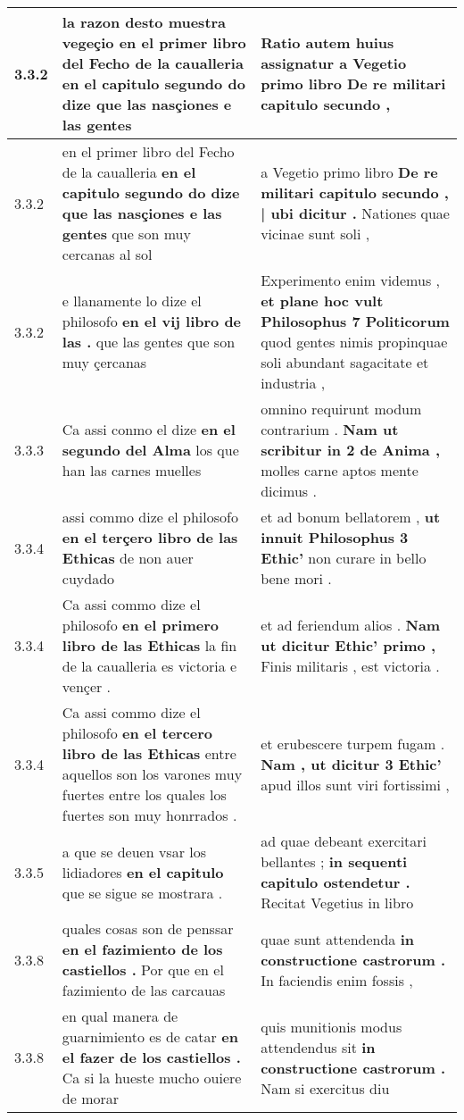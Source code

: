 \begin{tabular}{|p{1cm}|p{6.5cm}|p{6.5cm}|}
3.3.2 & la razon desto muestra vegeçio \textbf{ en el primer libro del Fecho de la caualleria } en el capitulo segundo do dize que las nasçiones e las gentes & Ratio autem huius assignatur \textbf{ a Vegetio primo libro } De re militari capitulo secundo , \\\hline
3.3.2 & en el primer libro del Fecho de la caualleria \textbf{ en el capitulo segundo do dize que las nasçiones e las gentes } que son muy cercanas al sol & a Vegetio primo libro \textbf{ De re militari capitulo secundo , | ubi dicitur . } Nationes quae vicinae sunt soli , \\\hline
3.3.2 & e llanamente lo dize el philosofo \textbf{ en el vij libro de las . } que las gentes que son muy çercanas & Experimento enim videmus , \textbf{ et plane hoc vult Philosophus 7 Politicorum } quod gentes nimis propinquae soli abundant sagacitate et industria , \\\hline
3.3.3 & Ca assi conmo el dize \textbf{ en el segundo del Alma } los que han las carnes muelles & omnino requirunt modum contrarium . \textbf{ Nam ut scribitur in 2 de Anima , } molles carne aptos mente dicimus . \\\hline
3.3.4 & assi commo dize el philosofo \textbf{ en el terçero libro de las Ethicas } de non auer cuydado & et ad bonum bellatorem , \textbf{ ut innuit Philosophus 3 Ethic’ } non curare in bello bene mori . \\\hline
3.3.4 & Ca assi commo dize el philosofo \textbf{ en el primero libro de las Ethicas } la fin de la caualleria es victoria e vençer . & et ad feriendum alios . \textbf{ Nam ut dicitur Ethic’ primo , } Finis militaris , est victoria . \\\hline
3.3.4 & Ca assi commo dize el philosofo \textbf{ en el tercero libro de las Ethicas } entre aquellos son los varones muy fuertes entre los quales los fuertes son muy honrrados . & et erubescere turpem fugam . \textbf{ Nam , ut dicitur 3 Ethic’ } apud illos sunt viri fortissimi , \\\hline
3.3.5 & a que se deuen vsar los lidiadores \textbf{ en el capitulo } que se sigue se mostrara . & ad quae debeant exercitari bellantes ; \textbf{ in sequenti capitulo ostendetur . } Recitat Vegetius in libro \\\hline
3.3.8 & quales cosas son de penssar \textbf{ en el fazimiento de los castiellos . } Por que en el fazimiento de las carcauas & quae sunt attendenda \textbf{ in constructione castrorum . } In faciendis enim fossis , \\\hline
3.3.8 & en qual manera de guarnimiento es de catar \textbf{ en el fazer de los castiellos . } Ca si la hueste mucho ouiere de morar & quis munitionis modus attendendus sit \textbf{ in constructione castrorum . } Nam si exercitus diu \\\hline

\end{tabular}
